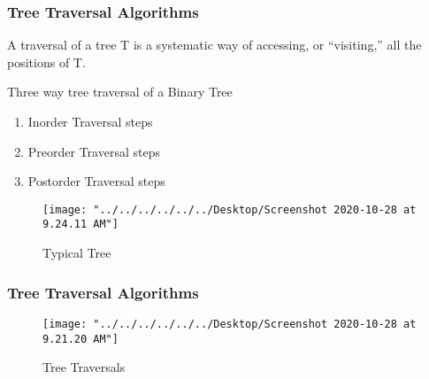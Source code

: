 \documentclass[11pt]{beamer}
\begin{document}
 	 \begin{frame}
 		\frametitle{Tree Traversal Algorithms}
 	     A traversal of a tree T is a systematic way of accessing, or “visiting,” all the positions of T. \\
 	     \begin{exampleblock}{{Three way tree traversal of a Binary Tree}}
 	     	\begin{enumerate}
 	     		\item Inorder Traversal steps
 	     		\item Preorder Traversal steps
 	     		\item Postorder Traversal steps
 	     	\end{enumerate}
 	     \end{exampleblock}   
         \begin{figure}
         	\centering
         	\texttt{[image: "../../../../../../Desktop/Screenshot 2020-10-28 at 9.24.11 AM"]}
         	\caption{Typical Tree}
         	\label{fig:screenshot-2020-10-28-at-9}
         \end{figure}       	
 	\end{frame}
 
    \begin{frame}
    	\frametitle{Tree Traversal Algorithms}
    	\begin{figure}
    		\centering
    		\texttt{[image: "../../../../../../Desktop/Screenshot 2020-10-28 at 9.21.20 AM"]}
    		\caption{Tree Traversals}
    		\label{fig:screenshot-2020-10-28-at-9}
    	\end{figure}
    \end{frame}
\end{document}
